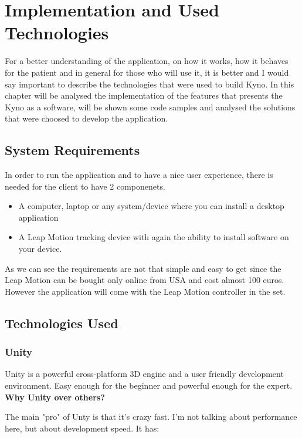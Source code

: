 \section{ Implementation and Used Technologies}

For a better understanding of the application, on how it works, how it behaves for the patient and in general for those who will use it, it is better and I would say important to describe the technologies that were used to build Kyno. In this chapter will be analysed the implementation of the features that presents the Kyno as a software, will be shown some code samples and analysed the solutions that were choosed to develop the application.

\subsection{System Requirements}
In order to run the application and to have a nice user experience, there is needed for the client to have 2 componenets.

\begin{itemize}
\item A computer, laptop or any system/device where you can install a desktop application

\item A Leap Motion tracking device with again the ability to install software on your device.
\end{itemize}

As we can see the requirements are not that simple and easy to get since the Leap Motion can be bought only online from USA and cost almost 100 euros. However the application will come with the Leap Motion controller in the set.

\subsection {Technologies Used}
\subsubsection {Unity}
Unity is a powerful cross-platform 3D engine and a user friendly development environment. Easy enough for the beginner and powerful enough for the expert.
\\
\textbf{Why Unity over others?}

The main "pro" of Unty is that it's crazy fast. I'm not talking about performance here, but about development speed. It has:

